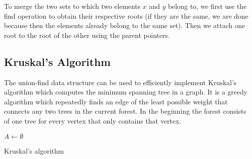 To merge the two sets to which two elements $x$ and $y$ belong to, we first use
the find operation to obtain their respective roots (if they are the same, we
are done because then the elements already belong to the same set). Then we
attach one root to the root of the other using the parent pointers.

\subsection*{Kruskal's Algorithm}
The union-find data structure can be used to efficiently implement Kruskal's
algorithm which computes the minimum spanning tree in a graph. It is a greedy
algorithm which repeatedly finds an edge of the least possible weight that connects
any two trees in the current forest. In the beginning the forest consists of one tree for every vertex that only contains that vertex.

\begin{algorithm}
  \SetAlgoLined%
  $A \gets \emptyset$\;
  \caption{Kruskal's algorithm}
\end{algorithm}

